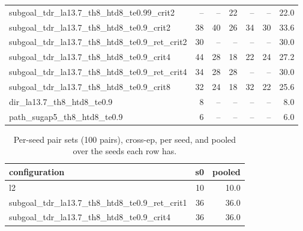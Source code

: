 \begin{table}[H]
\begin{tabular}{lrrrrrr}
subgoal\_tdr\_la13.7\_th8\_htd8\_te0.99\_crit2 & -- & -- & 22 & -- & -- & 22.0 \\
subgoal\_tdr\_la13.7\_th8\_htd8\_te0.9\_crit2 & 38 & 40 & 26 & 34 & 30 & 33.6 \\
subgoal\_tdr\_la13.7\_th8\_htd8\_te0.9\_ret\_crit2 & 30 & -- & -- & -- & -- & 30.0 \\
subgoal\_tdr\_la13.7\_th8\_htd8\_te0.9\_crit4 & 44 & 28 & 18 & 22 & 24 & 27.2 \\
subgoal\_tdr\_la13.7\_th8\_htd8\_te0.9\_ret\_crit4 & 34 & 28 & 28 & -- & -- & 30.0 \\
subgoal\_tdr\_la13.7\_th8\_htd8\_te0.9\_crit8 & 32 & 24 & 18 & 32 & 22 & 25.6 \\
dir\_la13.7\_th8\_htd8\_te0.9 & 8 & -- & -- & -- & -- & 8.0 \\
path\_sugap5\_th8\_htd8\_te0.9 & 6 & -- & -- & -- & -- & 6.0 \\
\bottomrule
\end{tabular}
\end{table}

\begin{table}[H]
\centering\small
\caption{Per-seed pair sets (100 pairs), cross-ep, per seed, and pooled over the seeds each row has.}
\label{tab:gas-mpc-pooled-cross-perseed-n100}
\begin{tabular}{lrr}
\toprule
configuration & s0 & pooled \\
\midrule
l2 & 10 & 10.0 \\
subgoal\_tdr\_la13.7\_th8\_htd8\_te0.9\_ret\_crit1 & 36 & 36.0 \\
subgoal\_tdr\_la13.7\_th8\_htd8\_te0.9\_crit4 & 36 & 36.0 \\
\bottomrule
\end{tabular}
\end{table}
